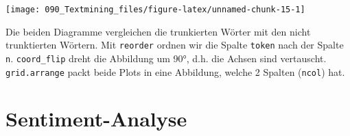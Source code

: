 \documentclass[12pt,]{book}
\makeatletter
\newenvironment{Shaded}{\begin{snugshade}}{\end{snugshade}}
\newcommand{\KeywordTok}[1]{\textcolor[rgb]{0.13,0.29,0.53}{\textbf{{#1}}}}
\newcommand{\DataTypeTok}[1]{\textcolor[rgb]{0.13,0.29,0.53}{{#1}}}
\newcommand{\DecValTok}[1]{\textcolor[rgb]{0.00,0.00,0.81}{{#1}}}
\newcommand{\StringTok}[1]{\textcolor[rgb]{0.31,0.60,0.02}{{#1}}}
\newcommand{\OtherTok}[1]{\textcolor[rgb]{0.56,0.35,0.01}{{#1}}}
\newcommand{\NormalTok}[1]{{#1}}
\newenvironment{kframe}{%
\medskip{}
\setlength{\fboxsep}{.8em}
 \def\at@end@of@kframe{}%
 \ifinner\ifhmode%
  \def\at@end@of@kframe{\end{minipage}}%
  \begin{minipage}{\columnwidth}%
 \fi\fi%
 \def\FrameCommand##1{\hskip\@totalleftmargin \hskip-\fboxsep
 \colorbox{shadecolor}{##1}\hskip-\fboxsep
     \hskip-\linewidth \hskip-\@totalleftmargin \hskip\columnwidth}%
 \MakeFramed {\advance\hsize-\width
   \@totalleftmargin\z@ \linewidth\hsize
   \@setminipage}}%
 {\par\unskip\endMakeFramed%
 \at@end@of@kframe}
\renewenvironment{Shaded}{\begin{kframe}}{\end{kframe}}
\makeatother
\begin{document}
\begin{Shaded}
\end{Shaded}

\begin{center}\texttt{[image: 090\_Textmining\_files/figure-latex/unnamed-chunk-15-1]} \end{center}

Die beiden Diagramme vergleichen die trunkierten Wörter mit den nicht
trunktierten Wörtern. Mit \texttt{reorder} ordnen wir die Spalte
\texttt{token} nach der Spalte \texttt{n}. \texttt{coord\_flip} dreht
die Abbildung um 90°, d.h. die Achsen sind vertauscht.
\texttt{grid.arrange} packt beide Plots in eine Abbildung, welche 2
Spalten (\texttt{ncol}) hat.

\section{Sentiment-Analyse}\label{sentiment-analyse}
\end{document}
